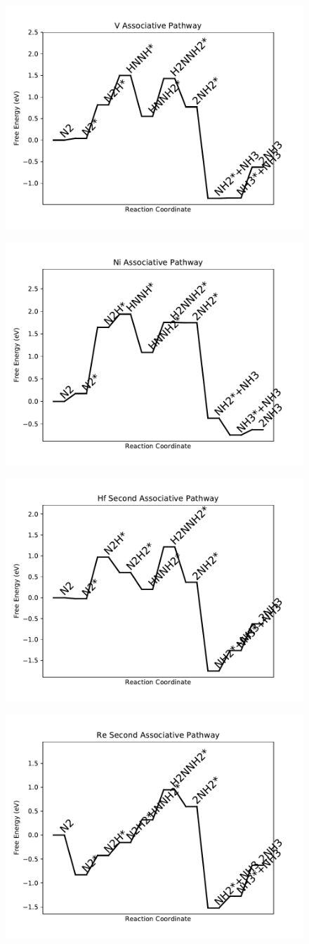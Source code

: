 \begin{figure}
\includegraphics[width=0.5\linewidth]{data/plots/V_associative.pdf}
\label{fig:V_associative}
\end{figure}

\begin{figure}
\includegraphics[width=0.5\linewidth]{data/plots/Ni_associative.pdf}
\label{fig:Ni_associative}
\end{figure}

\begin{figure}
\includegraphics[width=0.5\linewidth]{data/plots/Hf_associative_2.pdf}
\label{fig:Hf_associative_2}
\end{figure}

\begin{figure}
\includegraphics[width=0.5\linewidth]{data/plots/Re_associative_2.pdf}
\label{fig:Re_associative_2}
\end{figure}

